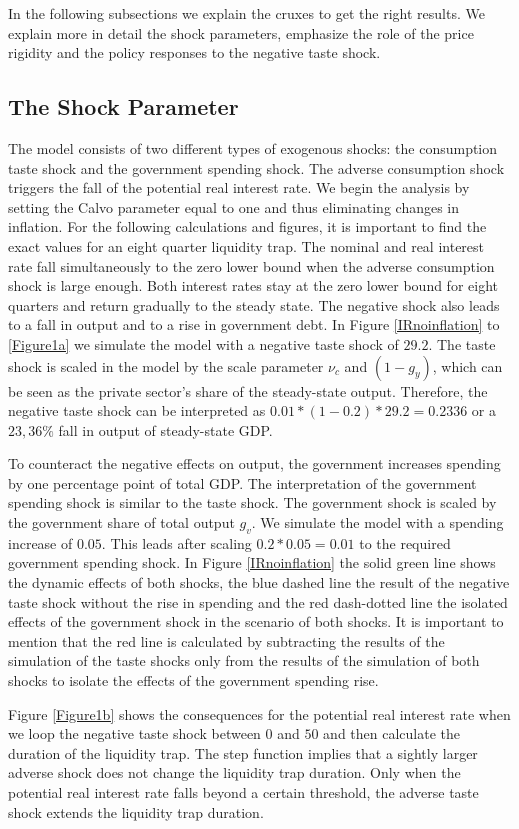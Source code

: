 \documentclass[12pt,a4paper,oneside,titlepage]{article}
\begin{document}
In the following subsections we explain the cruxes to get the right results. We explain more in detail the shock parameters, emphasize the role of the price rigidity and the policy responses to the negative taste shock.


\subsection*{The Shock Parameter}
The model consists of two different types of exogenous shocks: the consumption taste shock and the government spending shock. The adverse consumption shock triggers the fall of the potential real interest rate. We begin the analysis by setting the Calvo parameter equal to one and thus eliminating changes in inflation. For the following calculations and figures, it is important to find the exact values for an eight quarter liquidity trap. The nominal and real interest rate fall simultaneously to the zero lower bound when the adverse consumption shock is large enough. Both interest rates stay at the zero lower bound for eight quarters and return  gradually to the steady state. The negative shock also leads to a fall in output and to a rise in government debt. In Figure \ref{IRnoinflation} to \ref{Figure1a} we simulate the model with a negative taste shock of $29.2$. The taste shock is scaled in the model by the scale parameter $\nu_c$ and $\left(1- g_y\right)$, which can be seen as the private sector’s share of the steady-state output. Therefore, the negative taste shock can be interpreted as $0.01 * \left(1-0.2\right) * 29.2 = 0.2336$ or a $23,36\%$ fall in output of steady-state GDP.
\par
\bigskip
To counteract the negative effects on output, the government increases spending by one percentage point of total GDP. The interpretation of the government spending shock is similar to the taste shock.  The government shock is scaled by the government share of total output $g_v$. We simulate the model with a spending increase of $0.05$. This leads after scaling $0.2 * 0.05 = 0.01$ to the required government spending shock.
In Figure \ref{IRnoinflation} the solid green line shows the dynamic effects of both shocks, the blue dashed line the result of the negative taste shock without the rise in spending and the red dash-dotted line the isolated effects of the government shock in the scenario of both shocks. It is important to mention that the red line is calculated by subtracting the results of the simulation of the taste shocks only from the results of the simulation of both shocks to isolate the effects of the government spending rise.
\par
\bigskip
Figure \ref{Figure1b} shows the consequences for the potential real interest rate when we loop the negative taste shock between $0$ and $50$ and then calculate the duration of the liquidity trap.
The step function implies that a sightly larger adverse shock does not change the liquidity trap duration. Only when the potential real interest rate falls beyond a certain threshold, the adverse taste shock extends the liquidity trap duration.
\end{document}
